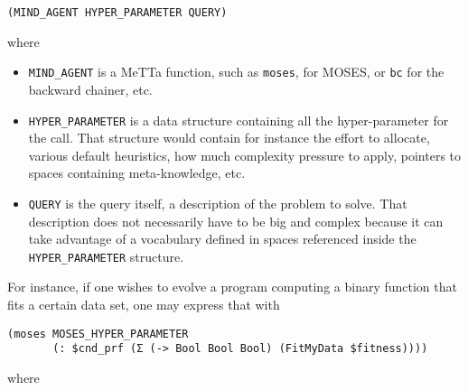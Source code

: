 \documentclass[]{report}
\begin{document}
\begin{verbatim}
(MIND_AGENT HYPER_PARAMETER QUERY)
\end{verbatim}
where
\begin{itemize}
\item \texttt{MIND_AGENT} is a MeTTa function, such as \texttt{moses},
for MOSES, or \texttt{bc} for the backward chainer, etc.
\item \texttt{HYPER_PARAMETER} is a data structure containing all the
  hyper-parameter for the call.  That structure would contain for
  instance the effort to allocate, various default heuristics, how
  much complexity pressure to apply, pointers to spaces containing
  meta-knowledge, etc.
\item \texttt{QUERY} is the query itself, a description of the problem to
  solve.  That description does not necessarily have to be big and
  complex because it can take advantage of a vocabulary defined in
  spaces referenced inside the \texttt{HYPER_PARAMETER} structure.
\end{itemize}

For instance, if one wishes to evolve a program computing a binary
function that fits a certain data set, one may express that with

\begin{verbatim}
(moses MOSES_HYPER_PARAMETER
       (: $cnd_prf (Σ (-> Bool Bool Bool) (FitMyData $fitness))))
\end{verbatim}
where
\end{document}
